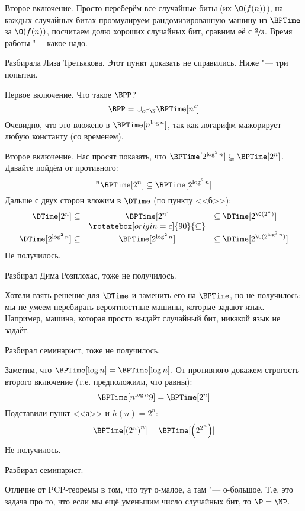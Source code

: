 	Второе включение.
	Просто переберём все случайные биты (их $\O(f(n))$), на каждых случайных битах проэмулируем рандомизированную машину из $\BPTime$
	за $\O(f(n))$, посчитаем долю хороших случайных бит, сравним её с $\sfrac 23$.
	Время работы "--- какое надо.

	Разбирала Лиза Третьякова.
	Этот пункт доказать не справились.
	Ниже "--- три попытки.

	Первое включение.
	Что такое $\BPP$?
	\[ \BPP = \cup_{c \in \N} \BPTime[n^c] \]
	Очевидно, что это вложено в $\BPTime[n^{\log n}]$, так как логарифм мажорирует любую константу (со временем).

	Второе включение.
	Нас просят показать, что $\BPTime[2^{\log^2n}] \subsetneq \BPTime[2^n]$.
	Давайте пойдём от противного:
	\[                                         ^n
		\BPTime[2^n] \subseteq \BPTime[2^{\log^2n}]
	\]
	Дальше с двух сторон вложим в $\DTime$ (по пункту <<б>>):
	\begin{gather*}
		\begin{array}{rcl}
			\DTime[2^n] \subseteq & \BPTime[2^n] & \subseteq \DTime[2^{\O(2^n)}] \\
			& \rotatebox[origin=c]{90}{\subseteq} & \\
			\DTime[2^{\log^2n}] \subseteq & \BPTime[2^{\log^2n}] & \subseteq \DTime[2^{\O(2^{\log^2 n})}]
		\end{array}
	\end{gather*}
	Не получилось.

	Разбирал Дима Розплохас, тоже не получилось.

	Хотели взять решение для $\DTime$ и заменить его на $\BPTime$, но не получилось:
	мы не умеем перебирать вероятностные машины, которые задают язык.
	Например, машина, которая просто выдаёт случайный бит, никакой язык не задаёт.

	Разбирал семинарист, тоже не получилось.

	Заметим, что $\BPTime[\log n] = \BPTime[\log n]$.
	От противного докажем строгость второго включение (т.е. предположили, что равны):
	\[
		\BPTime[n^{\log n}9] = \BPTime[2^n]
	\]
	Подставили пункт <<а>> и $h(n)=2^n$:
	\[
		\BPTime[\left(2^n\right)^n] = \BPTime[\left(2^{2^n}\right)]
	\]
	Не получилось.

	Разбирал семинарист.

	Отличие от PCP-теоремы в том, что тут о-малое, а там "--- о-большое.
	Т.е. это задача про то, что если мы ещё уменьшим число случайных бит, то $\P=\NP$.

